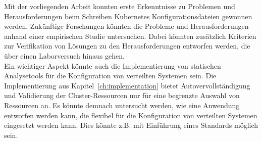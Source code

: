 Mit der vorliegenden Arbeit konnten erste Erkenntnisse zu Problemen und Herausforderungen beim Schreiben Kubernetes
Konfigurationsdateien gewonnen werden. Zukünftige Forschungen könnten die Probleme und Herausforderungen
anhand einer empirischen Studie untersuchen. Dabei könnten zusätzlich Kriterien zur Verifikation von Lösungen zu
den Herausforderungen entworfen werden, die über einen Laborversuch hinaus gehen.
\\
Ein wichtiger Aspekt könnte auch die Implementierung von statischen Analysetools für die Konfiguration von
verteilten Systemen sein. Die Implementierung aus Kapitel~\ref{ch:implementation} bietet Autovervollständigung und Validierung
der Cluster-Ressourcen nur für eine begrenzte Auswahl von Ressourcen an. Es könnte demnach untersucht werden,
wie eine Anwendung entworfen werden kann, die flexibel für die Konfiguration von verteilten Systemen eingesetzt werden kann.
Dies könnte z.B. mit Einführung eines Standards möglich sein.